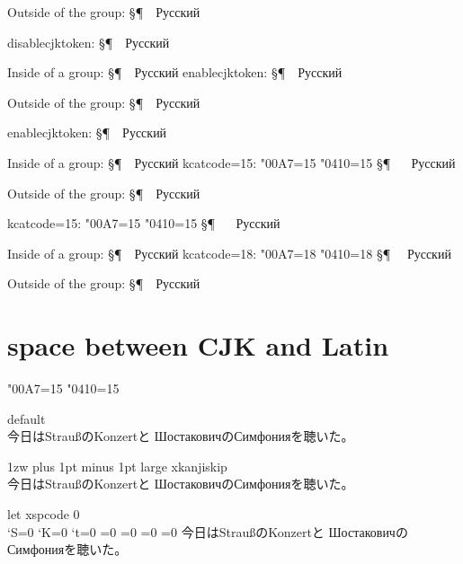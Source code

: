 \documentclass{ujarticle}
\begin{document}
Outside of the group:
§¶~~Русский


\disablecjktoken
\bs disablecjktoken: 
§¶~~Русский

{ Inside of a group: 
§¶~~Русский
\quad
\enablecjktoken
\bs enablecjktoken: 
§¶~~Русский
}

Outside of the group:
§¶~~Русский

\enablecjktoken
\bs enablecjktoken: 
§¶~~Русский

{ Inside of a group: 
\selectfont
§¶~~Русский
\quad
\bs kcatcode=15: 
\kcatcode\ucs"00A7=15%
\kcatcode\ucs"0410=15%
\selectfont
§¶
~~
\selectfont
Русский
}

Outside of the group:
§¶~~Русский

\bs kcatcode=15: 
\kcatcode\ucs"00A7=15%
\kcatcode\ucs"0410=15%
\selectfont
§¶
~~
\selectfont
Русский

{ Inside of a group: 
§¶~~Русский
\quad
\bs kcatcode=18: 
\kcatcode\ucs"00A7=18%
\kcatcode\ucs"0410=18%
\relax §¶~~%
Русский
}

Outside of the group:
§¶~~Русский


\newpage
\section{space between CJK and Latin}
\kcatcode\ucs"00A7=15%
\kcatcode\ucs"0410=15%

default\\
\selectfont
今日はStraußのKonzertと
\selectfont
ШостаковичのСимфонияを聴いた。

\xkanjiskip1zw plus 1pt minus 1pt
large \bs xkanjiskip\\
\selectfont
今日はStraußのKonzertと
\selectfont
ШостаковичのСимфонияを聴いた。

let xspcode 0\\
\xspcode`S=0
\xspcode`K=0
\xspcode`t=0
=0%
=0%
=0%
=0%
\selectfont
今日はStraußのKonzertと
\selectfont
ШостаковичのСимфонияを聴いた。
\end{document}
